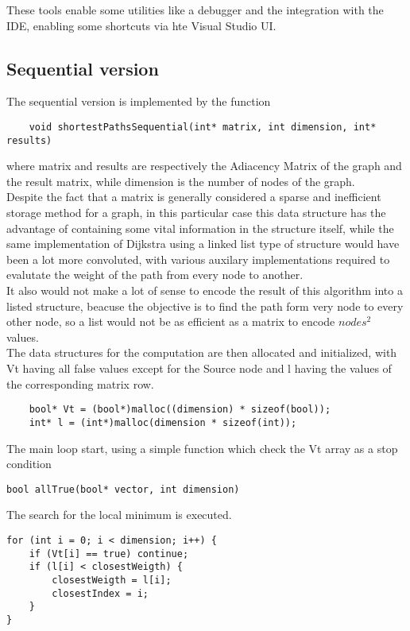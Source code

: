 \documentclass[
	a4paper, %
	12pt, %
]{class}
\begin{document}
These tools enable some utilities like a debugger and the integration with the IDE, enabling some shortcuts via hte Visual Studio UI. \\

\subsection{Sequential version}
The sequential version is implemented by the function

\begin{verbatim}
    void shortestPathsSequential(int* matrix, int dimension, int* results)
\end{verbatim}

where matrix and results are respectively the Adiacency Matrix of the graph and the result matrix, while dimension is the number
of nodes of the graph.\\

Despite the fact that a matrix is generally considered a sparse and inefficient storage method for a graph, in this particular case this data structure
has the advantage of containing some vital information in the structure itself, while the same implementation of Dijkstra using a linked list type of structure 
would have been a lot more convoluted, with various auxilary implementations required to evalutate the weight of the path from every node to another.\\

It also would not make a lot of sense to encode the result of this algorithm into a listed structure, beacuse the objective is to find the path form very node to every other node,
so a list would not be as efficient as a matrix to encode $nodes^2$ values.\\

The data structures for the computation are then allocated and initialized, with Vt having all false values except for the Source node
and l having the values of the corresponding matrix row.
\begin{verbatim}
    bool* Vt = (bool*)malloc((dimension) * sizeof(bool));
    int* l = (int*)malloc(dimension * sizeof(int));
\end{verbatim}

The main loop start, using a simple function which check the Vt array as a stop condition
\begin{verbatim}
bool allTrue(bool* vector, int dimension)
\end{verbatim}

The search for the local minimum is executed.
\begin{verbatim}
for (int i = 0; i < dimension; i++) {
    if (Vt[i] == true) continue;
    if (l[i] < closestWeigth) {
        closestWeigth = l[i];
        closestIndex = i;
    }
}
\end{verbatim}
\end{document}
